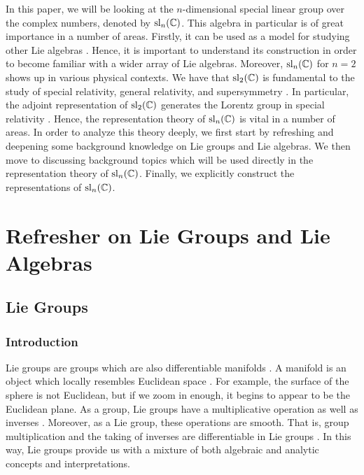 \documentclass[11pt, a4paper, oneside]{article}
\theoremstyle{plain}
\theoremstyle{definition}
\theoremstyle{example}
\begin{document}
\par
In this paper, we will be looking at the $n$-dimensional special linear group over the complex numbers, denoted by $\mathrm{sl}_n(\mathbb{C})$. This algebra in particular is of great importance in a number of areas. Firstly, it can be used as a model for studying other Lie algebras \cite{specialwiki}. Hence, it is important to understand its construction in order to become familiar with a wider array of Lie algebras. Moreover, $\mathrm{sl}_n(\mathbb{C})$ for $n = 2$ shows up in various physical contexts. We have that $\mathrm{sl}_2(\mathbb{C})$ is fundamental to the study of special relativity, general relativity, and supersymmetry \cite{specialwiki}. In particular, the adjoint representation of $\mathrm{sl}_2(\mathbb{C})$ generates the Lorentz group in special relativity \cite{specialwiki}. Hence, the representation theory of $\mathrm{sl}_n(\mathbb{C})$ is vital in a number of areas. In order to analyze this theory deeply, we first start by refreshing and deepening some background knowledge on Lie groups and Lie algebras. We then move to discussing background topics which will be used directly in the representation theory of $\mathrm{sl}_n(\mathbb{C})$. Finally, we explicitly construct the representations of $\mathrm{sl}_n(\mathbb{C})$.




\section{Refresher on Lie Groups and Lie Algebras}

\subsection{Lie Groups}

\subsubsection{Introduction}

Lie groups are groups which are also differentiable manifolds \cite{liegroupwiki}. A manifold is an object which locally resembles Euclidean space \cite{liegroupwiki}. For example, the surface of the sphere is not Euclidean, but if we zoom in enough, it begins to appear to be the Euclidean plane. As a group, Lie groups have a multiplicative operation as well as inverses \cite{liegroupwiki}. Moreover, as a Lie group, these operations are smooth. That is, group multiplication and the taking of inverses are differentiable in Lie groups \cite{liegroupwiki}. In this way, Lie groups provide us with a mixture of both algebraic and analytic concepts and interpretations.
\end{document}
